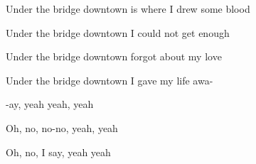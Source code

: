 \begin{song}
\bigskip

Under the bridge downtown  is where I drew some blood \par
{}Under the bridge downtown  I could not get enough \par
{}Under the bridge downtown  forgot about my love \par
{}Under the bridge downtown  I gave my life awa- \par

\bigskip

-ay, yeah  yeah, yeah \par
{}Oh, no, no-no, yeah, yeah \par
{}Oh, no, I say, yeah yeah \par
{}     \par
{} \par

\end{song}
